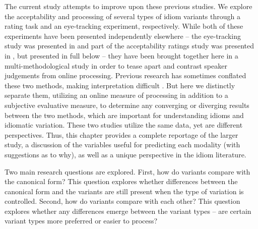 \documentclass[output=paper
,modfonts
,nonflat]{langsci/langscibook}
\begin{document}
The current study attempts to improve upon these previous studies. We explore the acceptability and processing of several types of idiom variants through a rating task and an eye-tracking experiment, respectively. While both of these experiments have been presented independently elsewhere -- the eye-tracking study was presented in \citet{GeeraertEtAl2017b} and part of the acceptability ratings study was presented in \citet{GeeraertEtAl2017}, but presented in full below -- they have been brought together here in a multi-methodological study  in order to tease apart and contrast speaker judgements from online processing. Previous research has sometimes conflated these two methods, making interpretation difficult \citep[cf.][]{GibbsEtAl1989, GibbsNayak1989}. But here we distinctly separate them, utilizing an online measure of processing in addition to a subjective evaluative measure, to determine any converging or diverging results between the two methods, which are important for understanding idioms and idiomatic variation. These two studies utilize the same data, yet are different perspectives. Thus, this chapter provides a complete reportage of the larger study, a discussion of the variables useful for predicting each modality (with suggestions as to why), as well as a unique perspective in the idiom literature.

Two main research questions are explored. First, how do variants compare with the canonical form? This question explores whether differences between the canonical form and the variants are still present when the type of variation is controlled. Second, how do variants compare with each other? This question explores whether any differences emerge between the variant types -- are certain variant types more preferred or easier to process?
\end{document}
